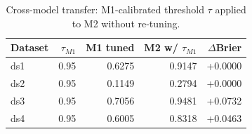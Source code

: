 \begin{table}[ht]
\centering
\small
\begin{tabular}{lrrrr}
\toprule
Dataset & $\tau_{M1}$ & M1 tuned & M2 w/ $\tau_{M1}$ & $\Delta$Brier \\
\midrule
ds1 & 0.95 & 0.6275 & 0.9147 & +0.0000 \\
ds2 & 0.95 & 0.1149 & 0.2794 & +0.0000 \\
ds3 & 0.95 & 0.7056 & 0.9481 & +0.0732 \\
ds4 & 0.95 & 0.6005 & 0.8318 & +0.0463 \\
\bottomrule
\end{tabular}
\caption{Cross-model transfer: M1-calibrated threshold $\tau$ applied to M2 without re-tuning.}
\label{tab:a13_cross_model}
\end{table}